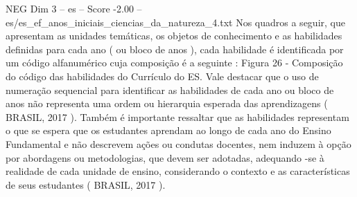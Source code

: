 \begin{textsample}{NEG Dim 3 – es – Score -2.00 – es/es\_ef\_anos\_iniciais\_ciencias\_da\_natureza\_4.txt}
Nos quadros a seguir, que apresentam as unidades temáticas, os objetos de conhecimento e as habilidades definidas para cada ano ( ou bloco de anos ), cada habilidade é identificada por um código alfanumérico cuja composição é a seguinte : Figura 26 - Composição do código das habilidades do Currículo do ES.
Vale destacar que o uso de numeração sequencial para identificar as habilidades de cada ano ou bloco de anos não representa uma ordem ou hierarquia esperada das aprendizagens ( BRASIL, 2017 ).
Também é importante ressaltar que as habilidades representam o que se espera que os estudantes aprendam ao longo de cada ano do Ensino Fundamental e não descrevem ações ou condutas docentes, nem induzem à opção por abordagens ou metodologias, que devem ser adotadas, adequando -se à realidade de cada unidade de ensino, considerando o contexto e as características de seus estudantes ( BRASIL, 2017 ).

\end{textsample}
